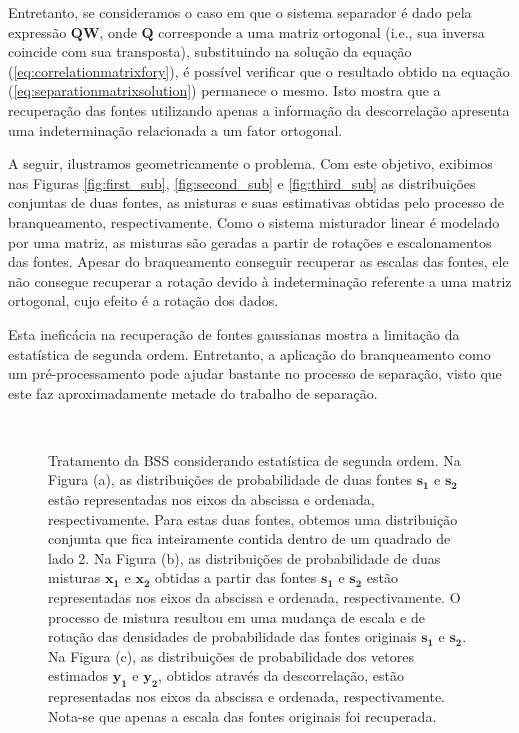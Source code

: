     Entretanto, se consideramos o caso em que o sistema separador é dado pela expressão $\mathbf{QW}$, onde $\mathbf{Q}$ corresponde a uma matriz ortogonal (i.e., sua inversa coincide com sua transposta), substituindo na solução da equação (\ref{eq:correlationmatrixfory}), é possível verificar que o resultado obtido na equação (\ref{eq:separationmatrixsolution}) permanece o mesmo. Isto mostra que a recuperação das fontes utilizando apenas a informação da descorrelação apresenta uma indeterminação relacionada a um fator ortogonal.
    
    A seguir, ilustramos geometricamente o problema. Com este objetivo, exibimos nas Figuras \ref{fig:first_sub}, \ref{fig:second_sub} e \ref{fig:third_sub} as distribuições conjuntas de duas fontes, as misturas e suas estimativas obtidas pelo processo de branqueamento, respectivamente. Como o sistema misturador linear é modelado por uma matriz, as misturas são geradas a partir de rotações e escalonamentos das fontes. Apesar do braqueamento conseguir recuperar as escalas das fontes, ele não consegue recuperar a rotação devido à indeterminação referente a uma matriz ortogonal, cujo efeito é a rotação dos dados.
    
    Esta ineficácia na recuperação de fontes gaussianas mostra a limitação da estatística de segunda ordem. Entretanto, a aplicação do branqueamento como um pré-processamento pode ajudar bastante no processo de separação, visto que este faz aproximadamente metade do trabalho de separação.
    
\begin{figure}
    \centering
    \\
    \caption{Tratamento da BSS considerando estatística de segunda ordem. Na Figura (a), as distribuições de probabilidade de duas fontes $\mathbf{s_1}$ e $\mathbf{s_2}$ estão representadas nos eixos da abscissa e ordenada, respectivamente. Para estas duas fontes, obtemos uma distribuição conjunta que fica inteiramente contida dentro de um quadrado de lado 2. Na Figura (b), as distribuições de probabilidade de duas misturas $\mathbf{x_1}$ e $\mathbf{x_2}$ obtidas a partir das fontes $\mathbf{s_1}$ e $\mathbf{s_2}$ estão representadas nos eixos da abscissa e ordenada, respectivamente. O processo de mistura resultou em uma mudança de escala e de rotação das densidades de probabilidade das fontes originais $\mathbf{s_1}$ e $\mathbf{s_2}$. Na Figura (c), as distribuições de probabilidade dos vetores estimados $\mathbf{y_1}$ e $\mathbf{y_2}$, obtidos através da descorrelação, estão representadas nos eixos da abscissa e ordenada, respectivamente. Nota-se que apenas a escala das fontes originais foi recuperada. }
    \label{fig:sample_subfigures}
\end{figure}


